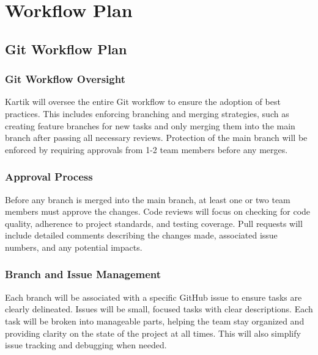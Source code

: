\documentclass{article}
\begin{document}

\section{Workflow Plan}


\subsection{Git Workflow Plan}

\subsubsection{Git Workflow Oversight} 
Kartik will oversee the entire Git workflow to ensure the adoption of best practices. This includes enforcing branching and merging strategies, such as creating feature branches for new tasks and only merging them into the main branch after passing all necessary reviews. Protection of the main branch will be enforced by requiring approvals from 1-2 team members before any merges.

\subsubsection{Approval Process} 
Before any branch is merged into the main branch, at least one or two team members must approve the changes. Code reviews will focus on checking for code quality, adherence to project standards, and testing coverage. Pull requests will include detailed comments describing the changes made, associated issue numbers, and any potential impacts.

\subsubsection{Branch and Issue Management} 
Each branch will be associated with a specific GitHub issue to ensure tasks are clearly delineated. Issues will be small, focused tasks with clear descriptions. Each task will be broken into manageable parts, helping the team stay organized and providing clarity on the state of the project at all times. This will also simplify issue tracking and debugging when needed.
\end{document}
